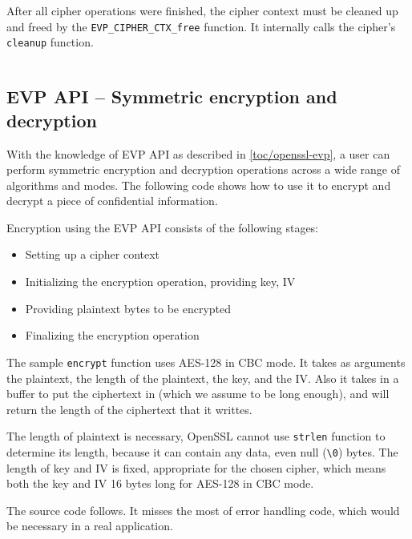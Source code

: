 \inputminted{c}{code/openssl-evp-cipherfinal.c}

After all cipher operations were finished, the cipher context must be cleaned up and freed by the \texttt{EVP\_CIPHER\_CTX\_free} function. It internally calls the cipher's \texttt{cleanup} function.

\inputminted{c}{code/openssl-evp-cipher-ctx-free.c}


\subsection{EVP API -- Symmetric encryption and decryption}
\label{toc/openssl-evp-encryption}

With the knowledge of EVP API as described in \autoref{toc/openssl-evp}, a user can perform symmetric encryption and decryption operations across a wide range of algorithms and modes. The following code shows how to use it to encrypt and decrypt a piece of confidential information.

Encryption using the EVP API consists of the following stages:

\begin{itemize}
  \item Setting up a cipher context
  \item Initializing the encryption operation, providing key, IV
  \item Providing plaintext bytes to be encrypted
  \item Finalizing the encryption operation
\end{itemize}

The sample \texttt{encrypt} function uses AES-128 in CBC mode. It takes as arguments the plaintext, the length of the plaintext, the key, and the IV. Also it takes in a buffer to put the ciphertext in (which we assume to be long enough), and will return the length of the ciphertext that it writtes.

The length of plaintext is necessary, OpenSSL cannot use \texttt{strlen} function to determine its length, because it can contain any data, even null (\texttt{\textbackslash0}) bytes. The length of key and IV is fixed, appropriate for the chosen cipher, which means both the key and IV 16 bytes long for AES-128 in CBC mode.

The source code follows. It misses the most of error handling code, which would be necessary in a real application.

\inputminted{c}{code/openssl-evp-encrypt.c}

